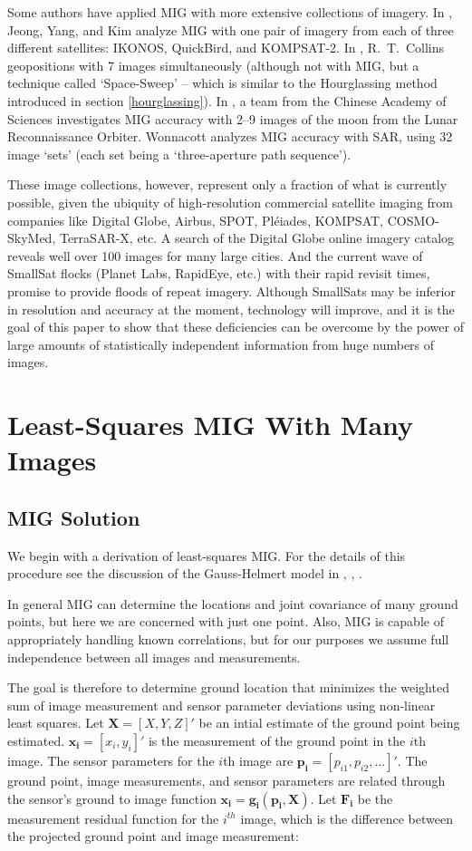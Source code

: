 \documentclass[10pt]{amsart}
\newcommand{\imgmeas}{\pmb{x_{i}}}
\newcommand{\grnd}{\pmb{X}}
\newcommand{\sensmeas}{\pmb{p_i}}
\begin{document}
Some authors have applied MIG with more extensive collections of imagery. In
\cite{JEONG_SIX}, Jeong, Yang, and Kim analyze MIG with one pair of imagery from
each of three different satellites: IKONOS, QuickBird, and KOMPSAT-2. In
\cite{PLANE_COLLINS}, R.~T.~Collins geopositions with 7 images simultaneously
(although not with MIG, but a technique called `Space-Sweep' -- which is
similar to the Hourglassing method introduced in section \ref{hourglassing}).
In \cite{LRO_NINE}, a team from the Chinese Academy of Sciences investigates MIG
accuracy with 2--9 images of the moon from the Lunar Reconnaissance
Orbiter. Wonnacott \cite{WONNACOT_32_3} analyzes MIG accuracy with SAR, using 32
image `sets' (each set being a `three-aperture path sequence').

These image collections, however, represent only a fraction of what is currently
possible, given the ubiquity of high-resolution commercial satellite imaging
from companies like Digital Globe, Airbus, SPOT, Pl\'eiades, KOMPSAT,
COSMO-SkyMed, TerraSAR-X, etc. A search of the Digital Globe online imagery
catalog \cite{BROWSE_DG} reveals well over 100 images for many large cities. And
the current wave of SmallSat flocks (Planet Labs, RapidEye, etc.) with their
rapid revisit times, promise to provide floods of repeat imagery. Although
SmallSats may be inferior in resolution and accuracy at the moment, technology
will improve, and it is the goal of this paper to show that these deficiencies
can be overcome by the power of large amounts of statistically independent
information from huge numbers of images.

\section{Least-Squares MIG With Many Images}
\subsection{MIG Solution}\label{MIG}
We begin with a derivation of least-squares MIG. For the details of this
procedure see the discussion of the Gauss-Helmert model in \cite{LSQRMIG},
\cite{PHOTO_CV}, \cite{MANUAL}.

In general MIG can determine the locations and joint covariance of many ground
points, but here we are concerned with just one point. Also, MIG is capable of
appropriately handling known correlations, but for our purposes we assume full
independence between all images and measurements.

The goal is therefore to determine ground location that minimizes the weighted
sum of image measurement and sensor parameter deviations using non-linear least
squares. Let $\grnd = [X, Y, Z]'$ be an intial estimate of the ground point
being estimated.  $\imgmeas = [x_{i}, y_{i}]'$ is the measurement of the ground
point in the $i$th image.  The sensor parameters for the $i$th image are
$\sensmeas = [p_{i1}, p_{i2}, \ldots]'$. The ground point, image measurements,
and sensor parameters are related through the sensor's ground to image function
$\imgmeas = \pmb{g_i}(\sensmeas, \grnd)$.  Let $\pmb{F_{i}}$ be the measurement
residual function for the $i^{th}$ image, which is the difference between the
projected ground point and image measurement:
\end{document}
